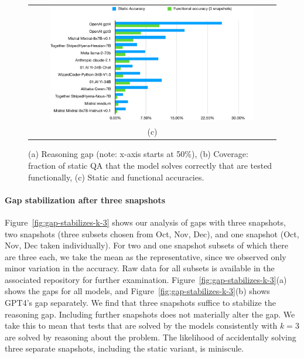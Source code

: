 \documentclass[11pt,a4paper]{article}
\begin{document}
\begin{figure}
\begin{tabular}{c}
    \includegraphics[width=0.85\textwidth]{all-static-vs-func-accuracy}\\
    (c)
  \end{tabular}
  \caption{\label{fig:accuracy-gap} (a) Reasoning gap (note: x-axis starts at 50\%), (b) Coverage: fraction of static QA that
  the model solves correctly that are tested functionally, (c) Static and functional accuracies.}
\end{figure}



\paragraph{Gap stabilization after three snapshots}
Figure~\ref{fig:gap-stabilizes-k-3} shows our analysis of gaps with three
snapshots, two snapshots (three subsets chosen from Oct, Nov, Dec), and one snapshot
(Oct, Nov, Dec taken individually).  For two and one snapshot subsets of which
there are three each, we take the mean as the representative, since we observed
only minor variation in the accuracy.  Raw data for all subsets is available in
the associated repository for further examination.
Figure~\ref{fig:gap-stabilizes-k-3}(a) shows the gaps for all models, and
Figure~\ref{fig:gap-stabilizes-k-3}(b) shows GPT4's gap separately.  We find
that three snapshots suffice to stabilize the reasoning gap. Including further
snapshots does not materially alter the gap.  We take this to mean that tests
that are solved by the models consistently with $k=3$ are solved by reasoning
about the problem. The likelihood of accidentally solving three separate
snapshots, including the static variant, is miniscule.
\end{document}
